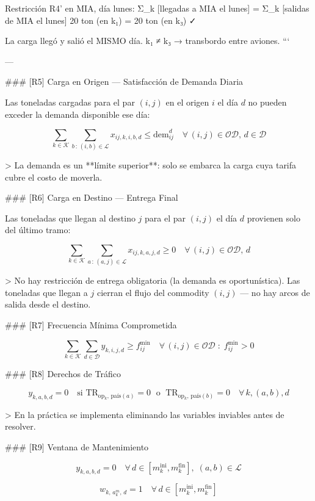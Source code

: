 Restricción R4' en MIA, día lunes:
  Σ_k [llegadas a MIA el lunes] = Σ_k [salidas de MIA el lunes]
         20 ton (en k₁)         =        20 ton (en k₃)   ✓

La carga llegó y salió el MISMO día. k₁ ≠ k₃ → transbordo entre aviones.
```

---

### [R5] Carga en Origen — Satisfacción de Demanda Diaria

Las toneladas cargadas para el par $(i,j)$ en el origen $i$ el día $d$ no pueden exceder la demanda disponible ese día:

$$
\sum_{k \in \mathcal{K}} \sum_{b \,:\, (i,b) \in \mathcal{L}} x_{ij,k,i,b,d} \leq \text{dem}_{ij}^d \quad \forall\, (i,j) \in \mathcal{OD},\, d \in \mathcal{D}
$$

> La demanda es un **límite superior**: solo se embarca la carga cuya tarifa cubre el costo de moverla.

### [R6] Carga en Destino — Entrega Final

Las toneladas que llegan al destino $j$ para el par $(i,j)$ el día $d$ provienen solo del último tramo:

$$
\sum_{k \in \mathcal{K}} \sum_{a \,:\, (a,j) \in \mathcal{L}} x_{ij,k,a,j,d} \geq 0 \quad \forall\, (i,j) \in \mathcal{OD},\, d
$$

> No hay restricción de entrega obligatoria (la demanda es oportunística). Las toneladas que llegan a $j$ cierran el flujo del commodity $(i,j)$ — no hay arcos de salida desde el destino.

### [R7] Frecuencia Mínima Comprometida

$$
\sum_{k \in \mathcal{K}} \sum_{d \in \mathcal{D}} y_{k,i,j,d} \geq f_{ij}^{\min} \quad \forall\, (i,j) \in \mathcal{OD} \;:\; f_{ij}^{\min} > 0
$$

### [R8] Derechos de Tráfico

$$
y_{k,a,b,d} = 0 \quad \text{si } \text{TR}_{\text{op}_k,\,\text{país}(a)} = 0 \;\text{ o }\; \text{TR}_{\text{op}_k,\,\text{país}(b)} = 0 \quad \forall\, k, (a,b), d
$$

> En la práctica se implementa eliminando las variables inviables antes de resolver.

### [R9] Ventana de Mantenimiento

$$
y_{k,a,b,d} = 0 \quad \forall\, d \in [m_k^{\text{ini}}, m_k^{\text{fin}}],\; (a,b) \in \mathcal{L}
$$

$$
w_{k,\, a_k^m,\, d} = 1 \quad \forall\, d \in [m_k^{\text{ini}}, m_k^{\text{fin}}]
$$

